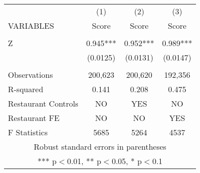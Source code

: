 \begin{tabular}{lccc} \hline
 & (1) & (2) & (3) \\
VARIABLES & Score & Score & Score \\ \hline
 &  &  &  \\
Z & 0.945*** & 0.952*** & 0.989*** \\
 & (0.0125) & (0.0131) & (0.0147) \\
 &  &  &  \\
Observations & 200,623 & 200,620 & 192,356 \\
R-squared & 0.141 & 0.208 & 0.475 \\
Restaurant Controls & NO & YES & NO \\
Restaurant FE & NO & NO & YES \\
 F Statistics & 5685 & 5264 & 4537 \\ \hline
\multicolumn{4}{c}{ Robust standard errors in parentheses} \\
\multicolumn{4}{c}{ *** p$<$0.01, ** p$<$0.05, * p$<$0.1} \\
\end{tabular}
